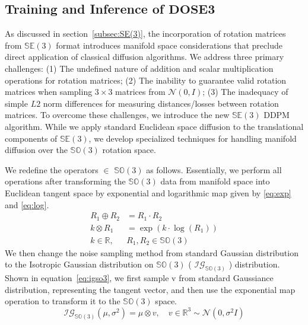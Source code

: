 \subsection{Training and Inference of $\mathbf{DOSE3}$}
As discussed in section~\ref{subsec:SE(3)}, the incorporation of rotation matrices from $\mathbb{SE}(3)$ format introduces manifold space considerations that preclude direct application of classical diffusion algorithms. We address three primary challenges:
(1) The undefined nature of addition and scalar multiplication operations for rotation matrices;
(2) The inability to guarantee valid rotation matrices when sampling $3\times 3$ matrices from $\mathcal{N}(0,I)$;
(3) The inadequacy of simple $L2$ norm differences for measuring distances/losses between rotation matrices.
To overcome these challenges, we introduce the new $\mathbb{SE}(3)$ DDPM algorithm. While we apply standard Euclidean space diffusion to the translational components of $\mathbb{SE}(3)$, we develop specialized techniques for handling manifold diffusion over the $\mathbb{SO}(3)$ rotation space.

We redefine the operators $\in$ $\mathbb{SO}(3)$ as follows. Essentially, we perform all operations after transforming the $\mathbb{SO}(3)$ data from manifold space into Euclidean tangent space by exponential and logarithmic map given by \cref{eq:exp} and \cref{eq:log}.
\begin{align}
    R_1 \oplus R_2 &= R_1 \cdot R_2\\
    k \otimes R_1 &= \exp(k \cdot \log(R_1)) \\
    k \in \mathbb{R},\  &R_1, R_2 \in \mathbb{SO}(3) \nonumber
\end{align}
We then change the noise sampling method from standard Gaussian distribution to the Isotropic Gaussian distribution on $\mathbb{SO}(3)$ ( $\mathcal{IG}_{\mathbb{SO}(3)}$ ) distribution. Shown in equation~\ref{eq:igso3}, we first sample v from standard Gaussiance distribution, representing the tangent vector, and then use the exponential map operation to transform it to the $\mathbb{SO}(3)$ space.
\begin{equation}
    \mathcal{IG}_{\mathbb{SO}(3)}(\mu, \sigma^2) = \mu \otimes v, \quad v \in \mathbb{R}^3 \sim \mathcal{N}(0,\sigma^2 I)
    \label{eq:igso3}
\end{equation}

